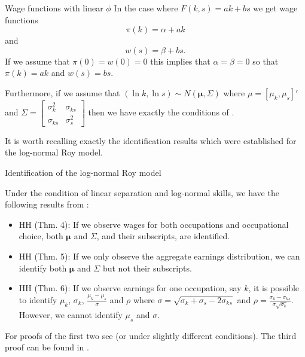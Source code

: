\documentclass{beamer}
\begin{document}
	\begin{frame}{Wage functions with linear $\phi$}
		In the case where $F(k,s) = ak + bs$ we get wage functions
		\begin{equation*}
			\pi(k) = \alpha + ak
		\end{equation*}
		and
		\begin{equation*}
			w(s) = \beta + bs.
		\end{equation*}
		If we assume that $\pi(0) = w(0) = 0$ this implies that $\alpha=\beta=0$ so that $\pi(k)=ak$ and $w(s)=bs$.
		
		\bigskip
		
		Furthermore, if we assume that $(\ln k, \ln s) \sim N(\mathbf{\mu},\Sigma)$ where $\mu = [\mu_k,\mu_s]'$ and $\Sigma=\begin{bmatrix}
			\sigma_k^2 & \sigma_{ks} \\
			\sigma_{ks} & \sigma_s^2
		\end{bmatrix}$ then we have exactly the conditions of \citet{heckman1990empirical}.\\
		
		\bigskip
		
		It is worth recalling exactly the identification results which were established for the log-normal Roy model.
	\end{frame}
	
	\begin{frame}{Identification of the log-normal Roy model}
		\begin{theorem}
			Under the condition of linear separation and log-normal skills, we have the following results from \citet{heckman1990empirical}:
			\begin{itemize}
				\item HH (Thm. 4): If we observe wages for both occupations and occupational choice, both $\mathbf{\mu}$ and $\Sigma$, and their subscripts, are identified.
				\smallskip
				\item  HH (Thm. 5): If we only observe the aggregate earnings distribution, we can identify both $\mathbf{\mu}$ and $\Sigma$ but not their subscripts.
				\smallskip
				\item HH (Thm. 6): If we observe earnings for one occupation, say $k$, it is possible to identify $\mu_k$, $\sigma_k$, $\frac{\mu_k - \mu_s}{\sigma}$ and $\rho$ where $\sigma = \sqrt{\sigma_k + \sigma_s -2 \sigma_{ks}}$ and $\rho = \frac{\sigma_k - \sigma_{ks}}{\sigma\sqrt{\sigma_k}}$. However, we cannot identify $\mu_s$ and $\sigma$.
			\end{itemize}
		\end{theorem}
		For proofs of the first two see \citet{basu1978identifiability} (or \citet{french2011identification} under slightly different conditions). The third proof can be found in \citet{heckman1990empirical}.
	\end{frame}
	
\end{document}
